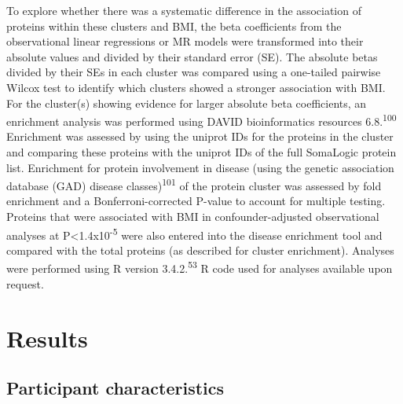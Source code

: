 \documentclass[11pt,twoside]{bristolthesis}
\begin{document}
To explore whether there was a systematic difference in the association of proteins within these clusters and BMI, the beta coefficients from the observational linear regressions or MR models were transformed into their absolute values and divided by their standard error (SE). The absolute betas divided by their SEs in each cluster was compared using a one-tailed pairwise Wilcox test to identify which clusters showed a stronger association with BMI. For the cluster(s) showing evidence for larger absolute beta coefficients, an enrichment analysis was performed using DAVID bioinformatics resources 6.8.\textsuperscript{100} Enrichment was assessed by using the uniprot IDs for the proteins in the cluster and comparing these proteins with the uniprot IDs of the full SomaLogic protein list. Enrichment for protein involvement in disease (using the genetic association database (GAD) disease classes)\textsuperscript{101} of the protein cluster was assessed by fold enrichment and a Bonferroni-corrected P-value to account for multiple testing. Proteins that were associated with BMI in confounder-adjusted observational analyses at P\textless1.4x10\textsuperscript{-5} were also entered into the disease enrichment tool and compared with the total proteins (as described for cluster enrichment). Analyses were performed using R version 3.4.2.\textsuperscript{53} R code used for analyses available upon request.

\hypertarget{results-3}{%
\section{Results}\label{results-3}}

\hypertarget{participant-characteristics-1}{%
\subsection{Participant characteristics}\label{participant-characteristics-1}}
\end{document}
